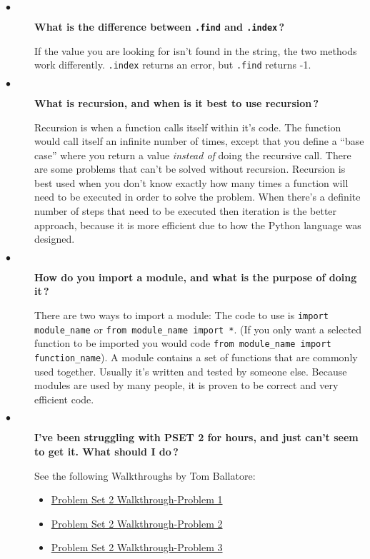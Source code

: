 \documentclass{article}
\newcommand{\inlinecode}[1]{\texttt{#1}}
\newcommand{\link}[2]{\textcolor{blue}{\href{#2}{#1}}}
\newcommand{\question}[1]{\item[$\bullet$] 
	\begin{minipage}[t]{\textwidth}
		\bfseries#1
	\end{minipage}
	\hfil
}
\newenvironment{answer}{}{}
\newenvironment{faq}{\begin{description}}{\end{description}}
\begin{document}
\begin{faq}
		\question{What is the difference between \inlinecode{.find} and \inlinecode{.index}\,?}
		\begin{answer}
			If the value you are looking for isn't found in the string, the two methods work differently.  \inlinecode{.index} returns an error, but \inlinecode{.find} returns -1.
		\end{answer}
		
		\question{What is recursion, and when is it best to use recursion\,?}
		\begin{answer}
			Recursion is when a function calls itself within it's code.  The function would call itself an infinite number of times, except that you define a ``base case'' where you return a value \textit{instead of} doing the recursive call.  There are some problems that can't be solved without recursion.  Recursion is best used when you don't know exactly how many times a function will need to be executed in order to solve the problem.  When there's a definite number of steps that need to be executed then iteration is the better approach, because it is more efficient due to how the Python language was designed.
		\end{answer}
		
		\question{How do you import a module, and what is the purpose of doing it\,?}
		\begin{answer}
			There are two ways to import a module:  The code to use is \inlinecode{import module_name} or \inlinecode{from module_name import *}.  (If you only want a selected function to be imported you would code \inlinecode{from module_name import function_name}). A module contains a set of functions that are commonly used together.  Usually it's written and tested by someone else.  Because modules are used by many people, it is proven to be correct and very efficient code. 
		\end{answer}
		
		\question{I've been struggling with PSET 2 for hours, and just can't seem to get it.  What should I do\,?}
		\begin{answer}
			See the following Walkthroughs by Tom Ballatore:
			\begin{itemize}
				\item[] \link{Problem Set 2 Walkthrough-Problem 1}{https://www.youtube.com/watch?v=m\_IJO\_oZyO8\&index=5\&list=PL4e66Kzl1JCF0rL\_uq-w2yPBP3mDsm7iD\&t=0s}
				
				\item[] \link{Problem Set 2 Walkthrough-Problem 2}{https://www.youtube.com/watch?v=sCRvoxedRhg\&index=6\&list=PL4e66Kzl1JCF0rL\_uq-w2yPBP3mDsm7iD\&t=0s}
				
				\item[] \link{Problem Set 2 Walkthrough-Problem 3}{https://www.youtube.com/watch?v=GuPy9LJae8Q\&index=7\&list=PL4e66Kzl1JCF0rL\_uq-w2yPBP3mDsm7iD\&t=0s}
			\end{itemize}
		\end{answer}
	\end{faq}
	
\end{document}
